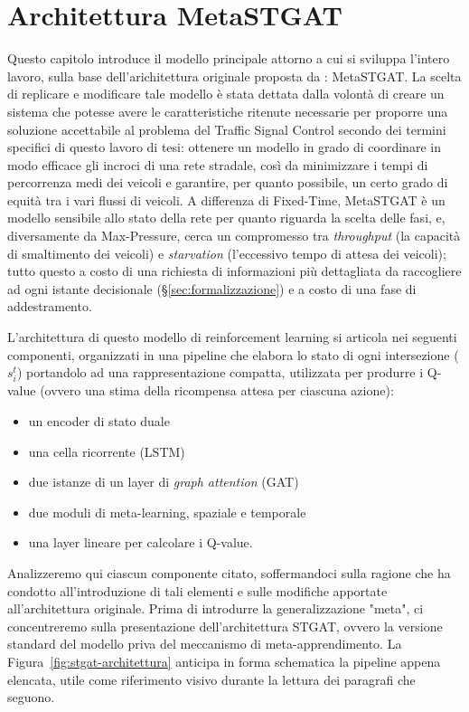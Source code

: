 \section{Architettura MetaSTGAT}
\label{sec:architettura}

Questo capitolo introduce il modello principale attorno a cui si sviluppa l'intero lavoro, sulla base dell'arichitettura originale proposta da \citep{wang2022metastgat}: MetaSTGAT.
La scelta di replicare e modificare tale modello è stata dettata dalla volontà di creare un sistema che potesse avere le caratteristiche ritenute necessarie
per proporre una soluzione accettabile al problema del Traffic Signal Control secondo dei termini specifici di questo lavoro di tesi:
ottenere un modello in grado di coordinare in modo efficace gli incroci di una rete stradale, così da minimizzare i tempi di percorrenza medi dei veicoli e
garantire, per quanto possibile, un certo grado di equità tra i vari flussi di veicoli.
A differenza di Fixed-Time, MetaSTGAT è un modello sensibile allo stato della rete per quanto riguarda la scelta delle fasi, e,
diversamente da Max-Pressure, cerca un compromesso tra \emph{throughput} (la capacità di smaltimento dei veicoli) e \emph{starvation} (l'eccessivo tempo di attesa dei veicoli);
tutto questo a costo di una richiesta di informazioni più dettagliata da raccogliere ad ogni istante decisionale (§\ref{sec:formalizzazione}) e a costo di una fase di addestramento.

L'architettura di questo modello di reinforcement learning si articola nei seguenti componenti, organizzati in una pipeline
che elabora lo stato di ogni intersezione ($s_i^t$) portandolo ad una rappresentazione compatta,
utilizzata per produrre i Q-value (ovvero una stima della ricompensa attesa per ciascuna azione):
\begin{itemize}
  \item un encoder di stato duale
  \item una cella ricorrente (LSTM)
  \item due istanze di un layer di \emph{graph attention} (GAT)
  \item due moduli di meta-learning, spaziale e temporale
  \item una layer lineare per calcolare i Q-value.
\end{itemize}

Analizzeremo qui ciascun componente citato, soffermandoci sulla ragione che ha condotto all'introduzione di tali elementi e
sulle modifiche apportate all'architettura originale.
Prima di introdurre la generalizzazione "meta",
ci concentreremo sulla presentazione dell'architettura STGAT,
ovvero la versione standard del modello priva del meccanismo di meta-apprendimento.
La Figura~\ref{fig:stgat-architettura} anticipa in forma schematica la pipeline appena
elencata, utile come riferimento visivo durante la lettura dei paragrafi che seguono.

